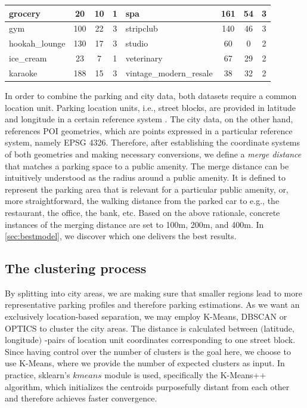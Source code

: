 \begin{table}[!ht]
{\begin{tabular}{ | l | c | c | c || l | c | c | c |}
				grocery  & 20 & 10 & 1 &  spa  & 161 & 54 & 3 \\ \hline
				gym  & 100 & 22 & 3 &  stripclub  & 140 & 46 & 3 \\ \hline
				hookah\_lounge  & 130 & 17 & 3 &  studio  & 60 & 0 & 2 \\ \hline
				ice\_cream  & 23 & 7 & 1 &  veterinary  & 67 & 29 & 2 \\ \hline
				karaoke  & 188 & 15 & 3 & {\scriptsize vintage\_modern\_resale}  & 38 & 32 & 2 \\ \hline
		\end{tabular}}
		\label{tab:amenities_google_places}
	\end{table}  
	
	In order to combine the parking and city data, both datasets require a common location unit. Parking location units, i.e., street blocks, are provided in latitude and longitude in a certain reference system . The city data, on the other hand, references POI geometries, which are points expressed in a particular reference system, namely EPSG 4326. Therefore, after establishing the coordinate systems of both geometries and making necessary conversions, we define a \textit{merge distance} that matches a parking space to a public amenity. The merge distance can be intuitively understood as the radius around a public amenity. It is defined to represent the parking area that is relevant for a particular public amenity, or, more straightforward, the walking distance from the parked car to e.g., the restaurant, the office, the bank, etc. Based on the above rationale, concrete instances of the merging distance are set to 100m, 200m, and 400m. In \cref{sec:bestmodel}, we discover which one delivers the best results.
	
	\subsection{The clustering process}
	By splitting into city areas, we are making sure that smaller regions lead to more representative parking profiles and therefore parking estimations. As we want an exclusively location-based separation, we may employ K-Means, DBSCAN or OPTICS to cluster the city areas. The distance is calculated between $($latitude$,$ longitude$)$ -pairs of location unit coordinates corresponding to one street block. Since having control over the number of clusters is the goal here, we choose to use K-Means, where we provide the number of expected clusters as input.  In practice, sklearn's $kmeans$ module is used, specifically the K-Means++ algorithm, which initializes the centroids purposefully distant from each other and therefore achieves faster convergence.
	
